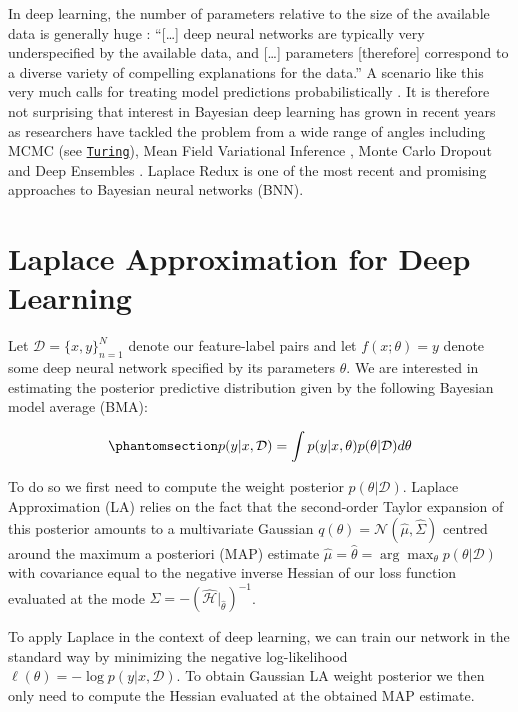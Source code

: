 \documentclass{juliacon}
\begin{document}
In deep learning, the number of parameters relative to the size of the
available data is generally huge \cite{wilson2020case}: ``{[}\ldots{]}
deep neural networks are typically very underspecified by the available
data, and {[}\ldots{]} parameters {[}therefore{]} correspond to a
diverse variety of compelling explanations for the data.'' A scenario
like this very much calls for treating model predictions
probabilistically \cite{wilson2020case}. It is therefore not surprising
that interest in Bayesian deep learning has grown in recent years as
researchers have tackled the problem from a wide range of angles
including MCMC (see
\href{https://turing.ml/dev/tutorials/03-bayesian-neural-network/}{\texttt{Turing}}),
Mean Field Variational Inference \cite{blundell2015weight}, Monte Carlo
Dropout \cite{gal2016dropout} and Deep Ensembles
\cite{lakshminarayanan2016simple}. Laplace Redux
\cite{immer2020improving,daxberger2021laplace} is one of the most recent
and promising approaches to Bayesian neural networks (BNN).

\section{Laplace Approximation for Deep Learning}\label{sec-body}

Let \(\mathcal{D}=\{x,y\}_{n=1}^N\) denote our feature-label pairs and
let \(f(x;\theta)=y\) denote some deep neural network specified by its
parameters \(\theta\). We are interested in estimating the posterior
predictive distribution given by the following Bayesian model average
(BMA):

\begin{equation}\phantomsection\label{eq-bma}{
p(y|x,\mathcal{D}) = \int p(y|x,\theta)p(\theta|\mathcal{D})d\theta
}\end{equation}

To do so we first need to compute the weight posterior
\(p(\theta|\mathcal{D})\). Laplace Approximation (LA) relies on the fact
that the second-order Taylor expansion of this posterior amounts to a
multivariate Gaussian \(q(\theta)=\mathcal{N}(\hat\mu,\hat\Sigma)\)
centred around the maximum a posteriori (MAP) estimate
\(\hat\mu=\hat{\theta}=\arg\max_{\theta}p(\theta|\mathcal{D})\) with
covariance equal to the negative inverse Hessian of our loss function
evaluated at the mode
\(\hat{\Sigma}=-(\hat{\mathcal{H}}|_{\hat{\theta}})^{-1}\).

To apply Laplace in the context of deep learning, we can train our
network in the standard way by minimizing the negative log-likelihood
\(\ell(\theta)=-\log p(y|x,\mathcal{D})\). To obtain Gaussian LA weight
posterior we then only need to compute the Hessian evaluated at the
obtained MAP estimate.
\end{document}
